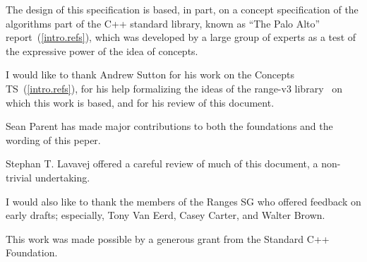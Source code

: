 \setcounter{chapter}{0}

The design of this specification is based, in part, on a concept
specification of the algorithms part of the C++ standard library, known
as ``The Palo Alto'' report~(\ref{intro.refs}), which was developed by a large
group of experts as a test of the expressive power of the idea of
concepts.

I would like to thank Andrew Sutton for his work on the Concepts TS~(\ref{intro.refs}),
for his help formalizing the ideas of the range-v3 library~\cite{range-v3} on which this
work is based, and for his review of this document.

Sean Parent has made major contributions to both the foundations and the wording of this
peper.

Stephan T. Lavavej offered a careful review of much of this document, a non-trivial undertaking.

I would also like to thank the members of the Ranges SG who offered feedback on early drafts;
especially, Tony Van Eerd, Casey Carter, and Walter Brown.

This work was made possible by a generous grant from the Standard C++ Foundation.
